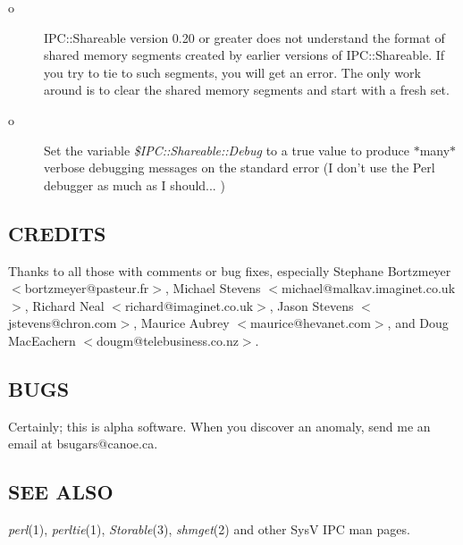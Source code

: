 \begin{description}
\item[o]
IPC::Shareable version 0.20 or greater does not understand the format
of shared memory segments created by earlier versions of
IPC::Shareable.  If you try to tie to such segments, you will get an
error.  The only work around is to clear the shared memory segments
and start with a fresh set.

\item[o]
Set the variable {\em \$IPC::Shareable::Debug\/} to a true value to produce
$\ast$many$\ast$ verbose debugging messages on the standard error (I don't use
the Perl debugger as much as I should... )

\end{description}

\subsection*{CREDITS}%

Thanks to all those with comments or bug fixes, especially Stephane
Bortzmeyer $<$bortzmeyer@pasteur.fr$>$, Michael Stevens
$<$michael@malkav.imaginet.co.uk$>$, Richard Neal
$<$richard@imaginet.co.uk$>$, Jason Stevens $<$jstevens@chron.com$>$, Maurice
Aubrey $<$maurice@hevanet.com$>$, and Doug MacEachern
$<$dougm@telebusiness.co.nz$>$.

\subsection*{BUGS}
Certainly; this is alpha software. When you discover an
anomaly, send me an email at bsugars@canoe.ca.

\subsection*{SEE ALSO}
{\em perl\/}(1), {\em perltie\/}(1), {\em Storable\/}(3), {\em shmget\/}(2) and other SysV IPC man
pages.

